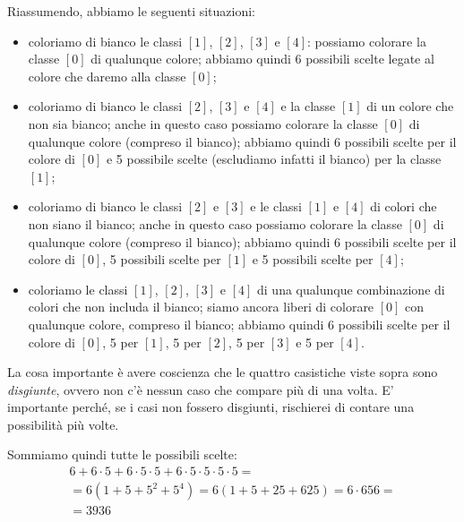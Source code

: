 \begin{soluzione}
    Riassumendo, abbiamo le seguenti situazioni:
    \begin{itemize}
        \item coloriamo di bianco le classi $[1]$, $[2]$, $[3]$ e $[4]$:
        possiamo colorare la classe $[0]$ di qualunque colore;
        abbiamo quindi 6 possibili scelte legate al colore che daremo alla classe $[0]$;
        \item coloriamo di bianco le classi $[2]$, $[3]$ e $[4]$ e la classe $[1]$ di un colore che non sia bianco;
        anche in questo caso possiamo colorare la classe $[0]$ di qualunque colore (compreso il bianco);
        abbiamo quindi 6 possibili scelte per il colore di $[0]$ e 5 possibile scelte (escludiamo infatti il bianco)
        per la classe $[1]$;
        \item coloriamo di bianco le classi $[2]$ e $[3]$ e le classi $[1]$ e $[4]$ di colori che non siano il bianco;
        anche in questo caso possiamo colorare la classe $[0]$ di qualunque colore (compreso il bianco);
        abbiamo quindi 6 possibili scelte per il colore di $[0]$, 5 possibili scelte per $[1]$ e 5 possibili scelte
        per $[4]$;
        \item coloriamo le classi $[1]$, $[2]$, $[3]$ e $[4]$ di una qualunque combinazione di colori che non includa
        il bianco;
        siamo ancora liberi di colorare $[0]$ con qualunque colore, compreso il bianco;
        abbiamo quindi 6 possibili scelte per il colore di $[0]$, 5 per $[1]$, 5 per $[2]$, 5 per $[3]$ e 5 per $[4]$.
    \end{itemize}

    La cosa importante è avere coscienza che le quattro casistiche viste sopra sono \emph{disgiunte}, ovvero non c'è
    nessun caso che compare più di una volta.
    E' importante perché, se i casi non fossero disgiunti, rischierei di contare una possibilità più volte.

    Sommiamo quindi tutte le possibili scelte:
    \begin{multline*}
        6 + 6 \cdot 5 + 6 \cdot 5 \cdot 5 + 6 \cdot 5 \cdot 5 \cdot 5 \cdot 5 = \\
        = 6(1 + 5 + 5^2 + 5^4) = 6(1 + 5 + 25 + 625) = 6 \cdot 656 = \\
        = 3936
    \end{multline*}
\end{soluzione}

